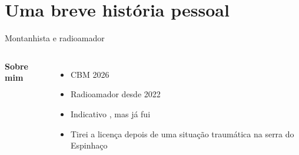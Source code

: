 
\section{Uma breve história pessoal}

\begin{frame}{Montanhista e radioamador}
  \begin{columns}[T,onlytextwidth]
      \textbf{Sobre mim}
      \begin{itemize}
      \item CBM 2026
      \item Radioamador desde 2022
      \item Indicativo , mas já fui 
      \item Tirei a licença depois de uma \alert{situação traumática} na serra do Espinhaço
      \end{itemize}
  \end{columns}
\end{frame}


